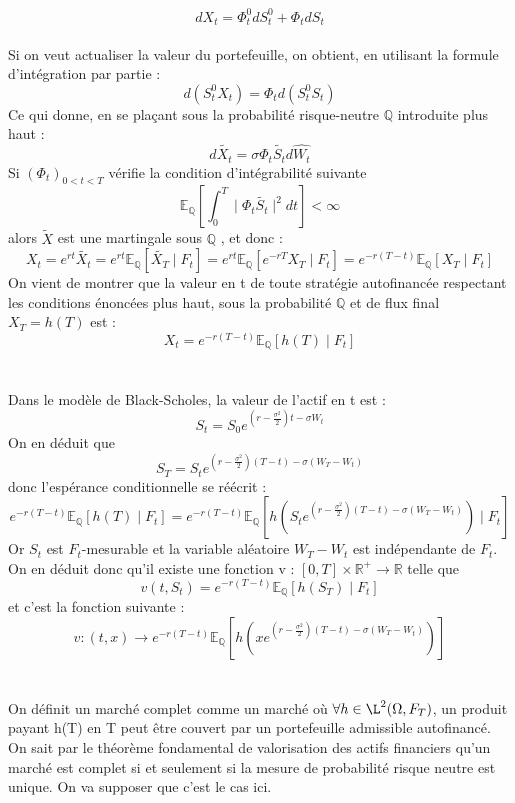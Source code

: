 \documentclass[french,12pt,a4paper]{article}
\begin{document}
$$ dX_t = \Phi_{t}^0 dS_{t}^0  + \Phi_t dS_{t}  $$ \\
Si on veut actualiser la valeur du portefeuille, on obtient, en utilisant la formule d'intégration par partie :
$$ d(S_{t}^0 X_t)  = \Phi_{t} d(S_{t}^0 S_{t}) $$
Ce qui donne, en se plaçant sous la probabilité risque-neutre $ \mathbb{Q} $ introduite plus haut :
$$ d \widetilde{X_{t}} = \sigma \Phi_t \widetilde{S_t} d \widehat{W_t}  $$
Si $ ( \Phi_t )_{0<t<T} $ vérifie la condition d'intégrabilité suivante
$$ \mathbb{E}_{\mathbb{Q}} \left [ \int_{0}^T \mid \Phi_t \widetilde{S_t} \mid^2 dt \right ] < \infty  $$
alors $ \widetilde{X} $ est une martingale sous $ \mathbb{Q} $ , et donc :
$$ X_t = e^{rt} \widetilde{X_t} = e^{rt} \mathbb{E}_{\mathbb{Q}} \left [ \widetilde{X_T} \mid F_t \right ] = e^{rt} \mathbb{E}_{\mathbb{Q}} \left [ e^{-rT} X_T \mid F_t \right ] = e^{-r(T-t)} \mathbb{E}_{\mathbb{Q}} \left [ X_T \mid F_t \right ]	$$
On vient de montrer que la valeur en t de toute stratégie autofinancée respectant les conditions énoncées plus haut, sous la probabilité $ \mathbb{Q} $ et de flux final $ X_T = h(T) $ est :
$$ X_t = e^{-r(T-t)} \mathbb{E}_{\mathbb{Q}} \left [ h(T) \mid F_t \right ]  	$$ \\ \\
Dans le modèle de Black-Scholes, la valeur de l'actif en t est :
$$ S_t = S_0 e^{  ( r - \frac{\sigma^2}{2} ) t - \sigma W_t}  	$$
On en déduit que
$$ S_T = S_t e^{ ( r - \frac{\sigma^2}{2} ) (T-t) - \sigma (W_T - W_t) } 	$$
donc l'espérance conditionnelle se réécrit :
$$ e^{-r(T-t)} \mathbb{E}_{\mathbb{Q}} \left [ h(T) \mid F_t \right ] = e^{-r(T-t)} \mathbb{E}_{\mathbb{Q}} \left [ h(S_t e^{ ( r - \frac{\sigma^2}{2} ) (T-t) - \sigma (W_T - W_t) }) \mid F_t \right ] $$
Or $ S_t $ est $ F_t $-mesurable et la variable aléatoire $ W_T - W_t $ est indépendante de $ F_t $.
\\
On en déduit donc qu'il existe une fonction v : $ [0,T]  \times \mathbb{R}^+ \to \mathbb{R} $ telle que
$$ v(t,S_t) = e^{-r(T-t)} \mathbb{E}_{\mathbb{Q}} \left [ h(S_T) \mid F_t \right ] 	$$
et c'est la fonction suivante :
$$ v : (t,x) \to  e^{-r(T-t)} \mathbb{E}_{\mathbb{Q}} \left [ h \left ( x e^{ ( r - \frac{\sigma^2}{2} ) (T-t) - \sigma (W_T - W_t) } \right ) \right ]   	$$
 \\ \\
On définit un marché complet comme un marché où  $ \forall h \in \L^2 (\Omega, F_T) $, un produit payant h(T) en T peut être couvert par un portefeuille admissible autofinancé. On sait par le théorème fondamental de valorisation des actifs financiers qu'un marché est complet si et seulement si la mesure de probabilité risque neutre est unique. On va supposer que c'est le cas ici.
\end{document}
